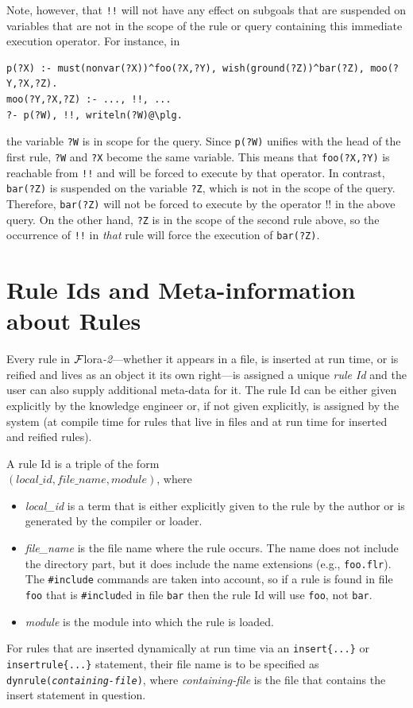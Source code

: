 \documentclass[11pt]{article}
\newcommand{\FLORA}{{\mbox{\sc ${\cal F}${lora}\rm\emph{-2}}}\xspace}
\newcommand{\FLSYSTEM}{\FLORA}
\newcommand{\flrext}{flr\xspace}
\begin{document}
Note, however, that \texttt{!!} will not have any effect on subgoals that
are suspended on variables that are not in the scope of the rule or query
containing this
immediate execution operator. For instance, in
\begin{verbatim}
p(?X) :- must(nonvar(?X))^foo(?X,?Y), wish(ground(?Z))^bar(?Z), moo(?Y,?X,?Z).
moo(?Y,?X,?Z) :- ..., !!, ...
?- p(?W), !!, writeln(?W)@\plg.
\end{verbatim}
the variable \texttt{?W} is in scope for the query. Since
\texttt{p(?W)} unifies with the head of the first rule, \texttt{?W} and
\texttt{?X} become the same variable. This means that \texttt{foo(?X,?Y)}
is reachable from \texttt{!!} and will be forced to execute by that operator.
In contrast, \texttt{bar(?Z)} is suspended on the variable \texttt{?Z},
which is not in the scope of the query. Therefore, \texttt{bar(?Z)} will
not be forced to execute by the operator !! in the above query.   
On the other hand, \texttt{?Z} is in the scope of the second rule above, so
the occurrence of \texttt{!!} in \emph{that} rule will force the execution of
\texttt{bar(?Z)}.   


\section{Rule Ids and Meta-information about Rules}
\label{sec-rule-id}

Every rule in \FLSYSTEM---whether it appears in a file, is inserted at run
time, or is reified and lives as an object it its own right---is assigned a
unique \emph{rule Id} and the user can also supply additional
meta-data for it. The rule Id can be either given explicitly by the
knowledge engineer or, if not given explicitly, is assigned by the system (at compile time for
rules that live in files and at run time for inserted and reified rules).

A rule Id is a triple of the form\\
$(local\_id,file\_name,module)$, where
\begin{itemize}
\item \emph{local\_id} is a term that is either explicitly given to the rule
  by the author or is generated by the compiler or loader.
\item \emph{file\_name} is the file name where the rule occurs. The name
  does not include the directory part, but it does include the name
  extensions (e.g., \texttt{foo.\flrext}). The \texttt{\#include} commands are
  taken into account, so if a rule is found in file \texttt{foo} that is
  \texttt{\#includ}ed in file \texttt{bar} then the rule Id will use
  \texttt{foo}, not \texttt{bar}.
\item \emph{module} is the module into which the rule is loaded. 
\end{itemize}
For rules that are inserted dynamically at run time
via an \texttt{insert\{...\}} or
\texttt{insertrule\{...\}}  statement, their file name is to be specified
as \texttt{dynrule(\textnormal{\emph{containing-file}})},
where \emph{containing-file} is the file that contains the insert
statement in question. 
\end{document}
